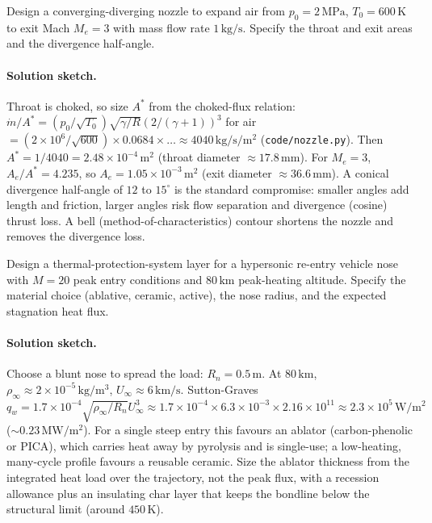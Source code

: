 \begin{exercise}
Design a converging-diverging nozzle to expand air from $p_0 =
2\,\text{MPa}$, $T_0 = 600\,\si{\kelvin}$ to exit Mach $M_e = 3$
with mass flow rate $1\,\si{\kilogram\per\second}$. Specify the
throat and exit areas and the divergence half-angle.
\paragraph{Solution sketch.} Throat is choked, so size $A^*$ from the
choked-flux relation: $\dot m/A^* = (p_0/\sqrt{T_0})\sqrt{\gamma/R}
(2/(\gamma+1))^{3}$ for air $= (2\times 10^{6}/\sqrt{600})\times
0.0684\times\dots \approx 4040\,\si{\kilogram\per\second}/\si{\meter}^2$
(\texttt{code/nozzle.py}). Then $A^* = 1/4040 = 2.48\times 10^{-4}\,
\si{\meter}^2$ (throat diameter $\approx 17.8\,\si{\milli\meter}$).
For $M_e = 3$, $A_e/A^* = 4.235$, so $A_e = 1.05\times 10^{-3}\,
\si{\meter}^2$ (exit diameter $\approx 36.6\,\si{\milli\meter}$). A
conical divergence half-angle of $12$ to $15^{\circ}$ is the standard
compromise: smaller angles add length and friction, larger angles
risk flow separation and divergence (cosine) thrust loss. A bell
(method-of-characteristics) contour shortens the nozzle and removes
the divergence loss.
\end{exercise}

\begin{exercise}
Design a thermal-protection-system layer for a hypersonic re-entry
vehicle nose with $M = 20$ peak entry conditions and $80\,\si{
\kilo\meter}$ peak-heating altitude. Specify the material choice
(ablative, ceramic, active), the nose radius, and the expected
stagnation heat flux.
\paragraph{Solution sketch.} Choose a blunt nose to spread the load:
$R_n = 0.5\,\si{\meter}$. At $80\,\si{\kilo\meter}$, $\rho_\infty
\approx 2\times 10^{-5}\,\si{\kilogram\per\meter\cubed}$, $U_\infty
\approx 6\,\si{\kilo\meter\per\second}$. Sutton-Graves
$q_w = 1.7\times 10^{-4}\sqrt{\rho_\infty/R_n}U_\infty^3 \approx
1.7\times 10^{-4}\times 6.3\times 10^{-3}\times 2.16\times 10^{11}
\approx 2.3\times 10^{5}\,\si{\watt\per\meter\squared}$
($\sim 0.23\,\si{\mega\watt\per\meter\squared}$). For a single steep
entry this favours an ablator (carbon-phenolic or PICA), which carries
heat away by pyrolysis and is single-use; a low-heating, many-cycle
profile favours a reusable ceramic. Size the ablator thickness from
the integrated heat load over the trajectory, not the peak flux, with
a recession allowance plus an insulating char layer that keeps the
bondline below the structural limit (around $450\,\si{\kelvin}$).
\end{exercise}

